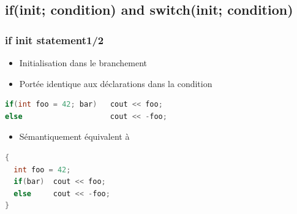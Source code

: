 \documentclass[C++.tex]{subfiles}
\begin{document}
\subsection*{if(init; condition) and switch(init; condition)}
\begin{frame}[fragile]
	\frametitle{if init statement\titlehfill{}1/2}
	\begin{itemize}
		\item Initialisation dans le branchement
		\item Portée identique aux déclarations dans la condition
	\end{itemize}

	\begin{lstlisting}[language=C++]
if(int foo = 42; bar)   cout << foo;
else                    cout << -foo;\end{lstlisting}

	\begin{itemize}
		\item Sémantiquement équivalent à
	\end{itemize}

	\begin{lstlisting}[language=C++]
{
  int foo = 42;
  if(bar)  cout << foo;
  else     cout << -foo;
}\end{lstlisting}
\end{frame}
\end{document}

